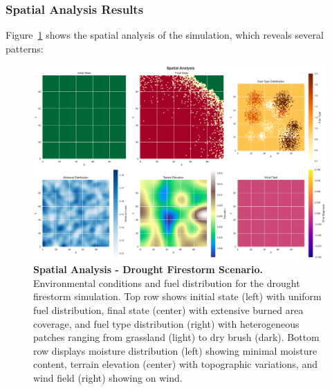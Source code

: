 \subsubsection{Spatial Analysis Results}
Figure~\ref{fig:spatial_df} shows the spatial analysis of the simulation, which reveals several patterns: \newline

\begin{figure}[H]
	\centering
	\includegraphics[width=\textwidth]{media/spatial_analysis_df.png}
	\caption{
		\textbf{Spatial Analysis - Drought Firestorm Scenario.} 
		Environmental conditions and fuel distribution for the drought firestorm simulation. Top row shows initial state (left) with uniform fuel distribution, final state (center) with extensive burned area coverage, and fuel type distribution (right) with heterogeneous patches ranging from grassland (light) to dry brush (dark). Bottom row displays moisture distribution (left) showing minimal moisture content, terrain elevation (center) with topographic variations, and wind field (right) showing on wind. 
	}
	\label{fig:spatial_df}
\end{figure}

